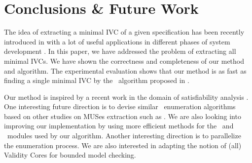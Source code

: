 \section{Conclusions \& Future Work}
\label{sec:conc}
The idea of extracting a minimal IVC of a given
specification has been recently introduced in \cite{Ghass16} with a lot of useful applications in different phases of system development \cite{Ghass16, Murugesan16:renext}.
In this paper, we have addressed the problem of extracting all minimal IVCs. We have shown
the correctness and completeness of our method and algorithm.
The experimental evaluation shows that our method is as fast as finding a single
 minimal IVC by the \ucbfalg ~algorithm proposed in \cite{Ghass16}.

 Our method is inspired by a recent work in the domain of satisfiability analysis \cite{marco2016fast}. One interesting future direction is to devise similar \mivc\ enumeration algorithms based on other studies on MUSes extraction such as \cite{Bacchus2016, nadel2014accelerated}.
 We are also looking into improving our implementation by using more
 efficient methods for the \isadeq ~and \getivc ~modules used by our algorithm.
 Another interesting direction is to parallelize the enumeration process.
 We are also interested in adapting the notion of (all) Validity Cores for bounded model checking. 